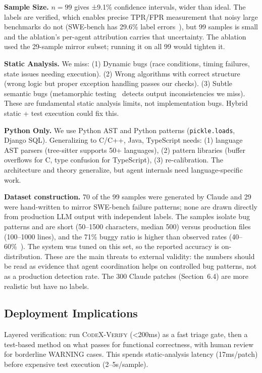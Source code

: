 \documentclass[10pt,twocolumn]{article}
\begin{document}
\textbf{Sample Size.} $n=99$ gives ±9.1\% confidence intervals, wider than ideal. The labels are verified, which enables precise TPR/FPR measurement that noisy large benchmarks do not (SWE-bench has 29.6\% label errors~\cite{xia2025swebench}), but 99 samples is small and the ablation's per-agent attribution carries that uncertainty. The ablation used the 29-sample mirror subset; running it on all 99 would tighten it.

\textbf{Static Analysis.} We miss: (1) Dynamic bugs (race conditions, timing failures, state issues needing execution). (2) Wrong algorithms with correct structure (wrong logic but proper exception handling passes our checks). (3) Subtle semantic bugs (metamorphic testing~\cite{wang2024metamorphic} detects output inconsistencies we miss). These are fundamental static analysis limits, not implementation bugs. Hybrid static + test execution could fix this.

\textbf{Python Only.} We use Python AST and Python patterns (\texttt{pickle.loads}, Django SQL). Generalizing to C/C++, Java, TypeScript needs: (1) language AST parsers (tree-sitter supports 50+ languages), (2) pattern libraries (buffer overflows for C, type confusion for TypeScript), (3) re-calibration. The architecture and theory generalize, but agent internals need language-specific work.

\textbf{Dataset construction.} 70 of the 99 samples were generated by Claude and 29 were hand-written to mirror SWE-bench failure patterns; none are drawn directly from production LLM output with independent labels. The samples isolate bug patterns and are short (50--1500 characters, median 500) versus production files (100--1000 lines), and the 71\% buggy ratio is higher than observed rates (40--60\%~\cite{jimenez2024swebench}). The system was tuned on this set, so the reported accuracy is on-distribution. These are the main threats to external validity: the numbers should be read as evidence that agent coordination helps on controlled bug patterns, not as a production detection rate. The 300 Claude patches (Section~6.4) are more realistic but have no labels.

\subsection{Deployment Implications}

Layered verification: run \textsc{CodeX-Verify} (<200ms) as a fast triage gate, then a test-based method on what passes for functional correctness, with human review for borderline WARNING cases. This spends static-analysis latency (17ms/patch) before expensive test execution (2--5s/sample).
\end{document}
